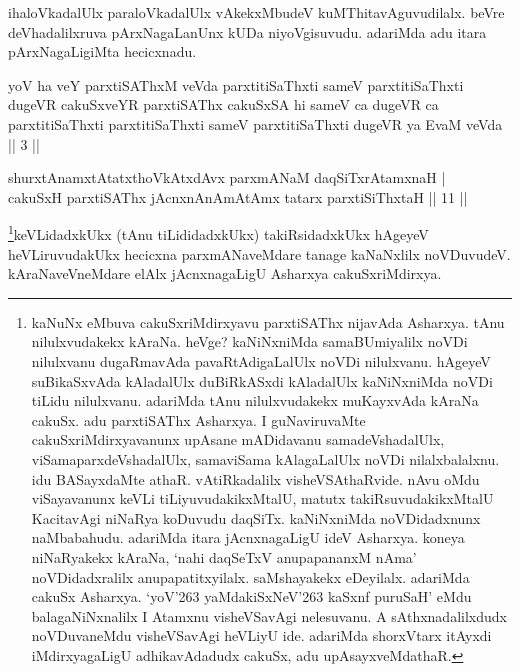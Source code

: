 \begin{artha} 
ihaloVkadalUlx paraloVkadalUlx vAkekxMbudeV kuMThitavAguvudilalx. 
beVre deVhadalilxruva pArxNagaLanUnx kUDa niyoVgisuvudu. adariMda adu 
itara pArxNagaLigiMta hecicxnadu.
\end{artha}

\begin{kandikeshl}
yoV ha veY parxtiSAThxM veVda parxtitiSaThxti sameV parxtitiSaThxti dugeVR cakuSxveYR parxtiSAThx cakuSxSA hi sameV ca dugeVR ca parxtitiSaThxti parxtitiSaThxti sameV parxtitiSaThxti dugeVR ya EvaM veVda || 3 ||
\end{kandikeshl}


\begin{shl}
shurxtAnamxtAtatxthoVkAtxdAvx parxmANaM daqSiTxrAtamxnaH | \\
cakuSxH parxtiSAThx jAcnxnAnAmAtAmx tatarx parxtiSiThxtaH \hfill|| 11 || 
\end{shl}

\begin{artha} 
\footnote{kaNuNx eMbuva cakuSxriMdirxyavu parxtiSAThx nijavAda 
Asharxya. tAnu nilulxvudakekx kAraNa. heVge? kaNiNxniMda samaBUmiyalilx 
noVDi nilulxvanu dugaRmavAda pavaRtAdigaLalUlx noVDi nilulxvanu. 
hAgeyeV suBikaSxvAda kAladalUlx duBiRkASxdi kAladalUlx kaNiNxniMda 
noVDi tiLidu nilulxvanu. adariMda tAnu nilulxvudakekx muKayxvAda 
kAraNa cakuSx. adu parxtiSAThx Asharxya. I guNaviruvaMte 
cakuSxriMdirxyavanunx upAsane mADidavanu samadeVshadalUlx, 
viSamaparxdeVshadalUlx, samaviSama kAlagaLalUlx noVDi nilalxbalalxnu. 
idu BASayxdaMte athaR. vAtiRkadalilx visheVSAthaRvide. nAvu oMdu 
viSayavanunx keVLi tiLiyuvudakikxMtalU, matutx takiRsuvudakikxMtalU 
KacitavAgi niNaRya koDuvudu daqSiTx. kaNiNxniMda noVDidadxnunx 
naMbabahudu. adariMda itara jAcnxnagaLigU ideV Asharxya. koneya 
niNaRyakekx kAraNa, `nahi daqSeTxV anupapananxM nAma' noVDidadxralilx 
anupapatitxyilalx. saMshayakekx eDeyilalx. adariMda cakuSx Asharxya. 
`yoV\char'263 yaMdakiSxNeV\char'263 kaSxnf puruSaH' eMdu 
balagaNiNxnalilx I Atamxnu visheVSavAgi nelesuvanu. A sAthxnadalilxdudx 
noVDuvaneMdu visheVSavAgi heVLiyU ide. adariMda shorxVtarx itAyxdi 
iMdirxyagaLigU adhikavAdadudx cakuSx, adu upAsayxveMdathaR.}keVLidadxkUkx (tAnu tiLididadxkUkx) takiRsidadxkUkx 
hAgeyeV heVLiruvudakUkx hecicxna parxmANaveMdare tanage kaNaNxlilx 
noVDuvudeV. kAraNaveVneMdare elAlx jAcnxnagaLigU Asharxya 
cakuSxriMdirxya.
\end{artha}

